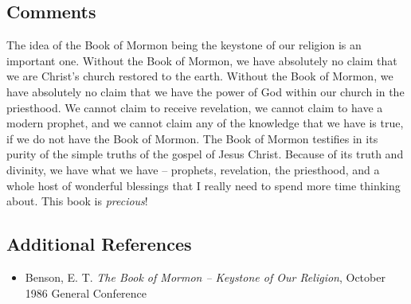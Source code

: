 \documentclass[12pt]{report}
\begin{document}
\subsection{Comments\label{example_comment}}
The idea of the Book of Mormon being the keystone of our religion is an important one.  Without the Book of Mormon, we have absolutely no claim that we are Christ's church restored to the earth.  Without the Book of Mormon, we have absolutely no claim that we have the power of God within our church in the priesthood.  We cannot claim to receive revelation, we cannot claim to have a modern prophet, and we cannot claim any of the knowledge that we have is true, if we do not have the Book of Mormon.  The Book of Mormon testifies in its purity of the simple truths of the gospel of Jesus Christ.  Because of its truth and divinity, we have what we have -- prophets, revelation, the priesthood, and a whole host of wonderful blessings that I really need to spend more time thinking about.  This book is \emph{precious}!

\subsection{Additional References\label{intro:references6}}
\begin{itemize}
\item Benson, E. T. \emph{The Book of Mormon -- Keystone of Our Religion}, October 1986 General Conference
\end{itemize}
\printindex
\end{document}
